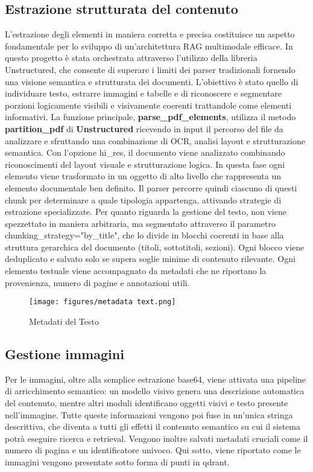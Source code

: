 \subsection{Estrazione strutturata del contenuto}
L'estrazione degli elementi in maniera corretta e precisa costituisce un aspetto fondamentale per lo sviluppo di un'architettura RAG multimodale efficace. In questo progetto è stata orchestrata attraverso l'utilizzo della libreria Unstructured, che consente di superare i limiti dei parser tradizionali fornendo una visione semantica e strutturata dei documenti. L'obiettivo è stato quello di individuare testo, estrarre immagini e tabelle e di riconoscere e segmentare porzioni logicamente visibili e visivamente coerenti trattandole come elementi informativi. 
La funzione principale, \textbf{parse\_pdf\_elements}, utilizza il metodo \textbf{partition\_pdf} di \textbf{Unstructured} ricevendo in input il percorso del file da analizzare e sfruttando una combinazione di OCR, analisi layout e strutturazione semantica. Con l'opzione hi\_res, il documento viene analizzato combinando riconoscimenti del layout visuale e strutturazione logica. In questa fase ogni elemento viene trasformato in un oggetto di alto livello che rappresenta un elemento documentale ben definito. Il parser percorre quindi ciascuno di questi chunk per determinare a quale tipologia appartenga, attivando strategie di estrazione specializzate. Per quanto riguarda la gestione del testo, non viene spezzettato in maniera arbitraria, ma segmentato  attraverso il parametro chunking\_strategy="by\_title", che lo divide in blocchi coerenti in base alla struttura gerarchica del documento (titoli, sottotitoli, sezioni). Ogni blocco viene deduplicato e salvato solo se supera soglie minime di contenuto rilevante. Ogni elemento testuale viene accompagnato da metadati che ne riportano la provenienza, numero di pagine e annotazioni utili. 
\begin{figure}[!ht]
\centering
\texttt{[image: figures/metadata text.png]}
\caption{Metadati del Testo}
\end{figure}

\subsection{Gestione immagini}

Per le immagini, oltre alla semplice estrazione base64, viene attivata una pipeline di arricchimento semantico: un modello visivo genera una descrizione automatica del contenuto, mentre altri moduli identificano oggetti visivi e testo presente nell'immagine. Tutte queste informazioni vengono poi fuse in un'unica stringa descrittiva, che diventa a tutti gli effetti il contenuto semantico su cui il sistema potrà eseguire ricerca e retrieval. Vengono inoltre salvati metadati cruciali come il numero di pagina e un identificatore univoco. Qui sotto, viene riportato come le immagini vengono presentate sotto forma di punti in qdrant. 

